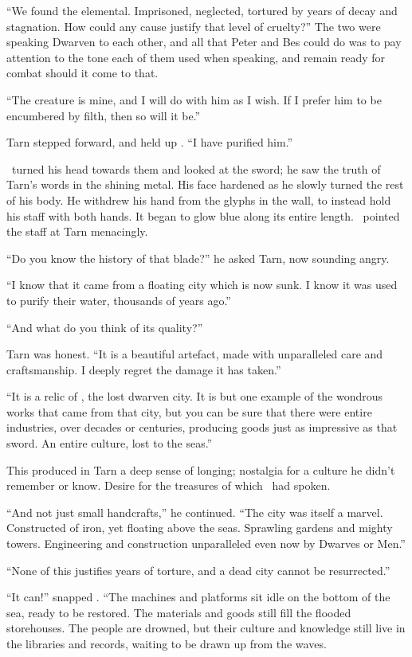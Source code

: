 ``We found the elemental.  Imprisoned, neglected, tortured by years of decay and stagnation.  How could any cause justify that level of cruelty?''  The two were speaking Dwarven to each other, and all that Peter and Bes could do was to pay attention to the tone each of them used when speaking, and remain ready for combat should it come to that.

``The creature is mine, and I will do with him as I wish.  If I prefer him to be encumbered by filth, then so will it be.''

Tarn stepped forward, and held up \kildir.  ``I have purified him.''

\mothzam\ turned his head towards them and looked at the sword; he saw the truth of Tarn's words in the shining metal.  His face hardened as he slowly turned the rest of his body.  He withdrew his hand from the glyphs in the wall, to instead hold his staff with both hands.  It began to glow blue along its entire length.  \mothzam\ pointed the staff at Tarn menacingly.

``Do you know the history of that blade?'' he asked Tarn, now sounding angry.

``I know that it came from a floating city which is now sunk.  I know it was used to purify their water, thousands of years ago.''

``And what do you think of its quality?''

Tarn was honest.  ``It is a beautiful artefact, made with unparalleled care and craftsmanship.  I deeply regret the damage it has taken.''

``It is a relic of \valdunmir, the lost dwarven city.  It is but one example of the wondrous works that came from that city, but you can be sure that there were entire industries, over decades or centuries, producing goods just as impressive as that sword.  An entire culture, lost to the seas.''

This produced in Tarn a deep sense of longing; nostalgia for a culture he didn't remember or know.  Desire for the treasures of which \mothzam\ had spoken.

``And not just small handcrafts,'' he continued. ``The city was itself a marvel.  Constructed of iron, yet floating above the seas.  Sprawling gardens and mighty towers.  Engineering and construction unparalleled even now by Dwarves or Men.''

``None of this justifies years of torture, and a dead city cannot be resurrected.''

``It can!'' snapped \mothzam.  ``The machines and platforms sit idle on the bottom of the sea, ready to be restored.  The materials and goods still fill the flooded storehouses.  The people are drowned, but their culture and knowledge still live in the libraries and records, waiting to be drawn up from the waves.

